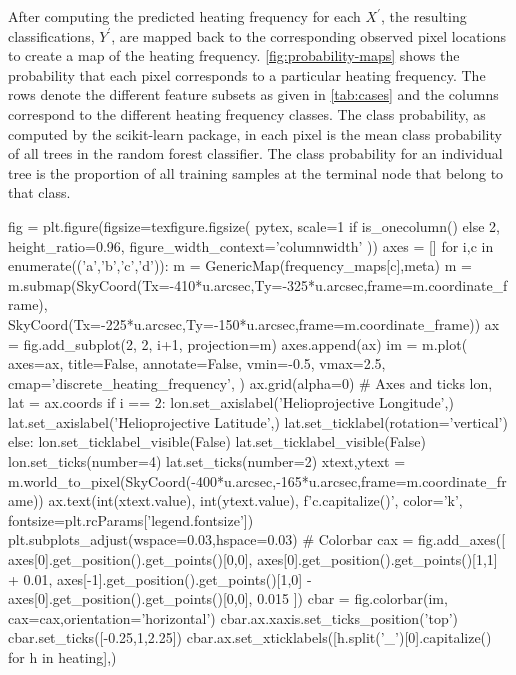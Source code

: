 After computing the predicted heating frequency for each $X^\prime$, the resulting classifications, $Y^\prime$, are mapped back to the corresponding observed pixel locations to create a map of the heating frequency.
\autoref{fig:probability-maps} shows the probability that each pixel corresponds to a particular heating frequency.
The rows denote the different feature subsets as given in \autoref{tab:cases} and the columns correspond to the different heating frequency classes.
The class probability, as computed by the scikit-learn package, in each pixel is the mean class probability of all trees in the random forest classifier.
The class probability for an individual tree is the proportion of all training samples at the terminal node that belong to that class.

\begin{pycode}[manager_ml]
fig = plt.figure(figsize=texfigure.figsize(
    pytex,
    scale=1 if is_onecolumn() else 2,
    height_ratio=0.96,
    figure_width_context='columnwidth'
))
axes = []
for i,c in enumerate(('a','b','c','d')):
    m = GenericMap(frequency_maps[c],meta)
    m = m.submap(SkyCoord(Tx=-410*u.arcsec,Ty=-325*u.arcsec,frame=m.coordinate_frame),
                 SkyCoord(Tx=-225*u.arcsec,Ty=-150*u.arcsec,frame=m.coordinate_frame))
    ax = fig.add_subplot(2, 2, i+1, projection=m)
    axes.append(ax)
    im = m.plot(
        axes=ax,
        title=False,
        annotate=False,
        vmin=-0.5,
        vmax=2.5,
        cmap='discrete_heating_frequency',
    )
    ax.grid(alpha=0)
    # Axes and ticks
    lon, lat = ax.coords
    if i == 2:
        lon.set_axislabel('Helioprojective Longitude',)
        lat.set_axislabel('Helioprojective Latitude',)
        lat.set_ticklabel(rotation='vertical')
    else:
        lon.set_ticklabel_visible(False)
        lat.set_ticklabel_visible(False)
    lon.set_ticks(number=4)
    lat.set_ticks(number=2)
    xtext,ytext = m.world_to_pixel(SkyCoord(-400*u.arcsec,-165*u.arcsec,frame=m.coordinate_frame))
    ax.text(int(xtext.value), int(ytext.value), f'{c.capitalize()}', color='k', fontsize=plt.rcParams['legend.fontsize'])
plt.subplots_adjust(wspace=0.03,hspace=0.03)
# Colorbar
cax = fig.add_axes([
    axes[0].get_position().get_points()[0,0],
    axes[0].get_position().get_points()[1,1] + 0.01,
    axes[-1].get_position().get_points()[1,0] - axes[0].get_position().get_points()[0,0],
    0.015
])
cbar = fig.colorbar(im, cax=cax,orientation='horizontal')
cbar.ax.xaxis.set_ticks_position('top')
cbar.set_ticks([-0.25,1,2.25])
cbar.ax.set_xticklabels([h.split('_')[0].capitalize() for h in heating],)

\end{pycode}
